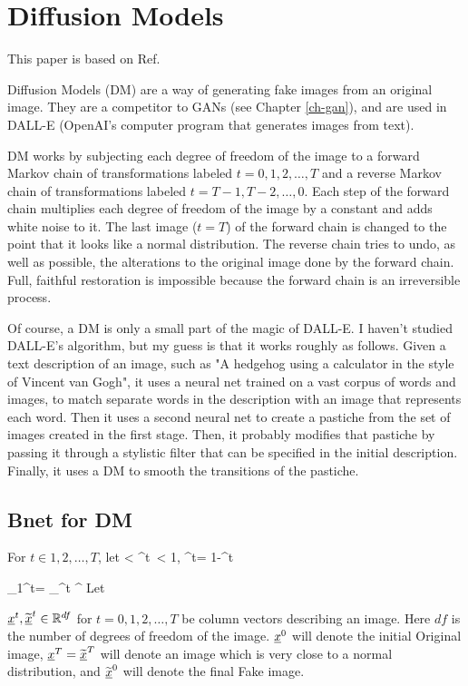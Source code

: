 \chapter{Diffusion Models}
\label{ch-diffusion}
\newcommand{\prodalp}[0]{\pi_1^t\alp}

This paper is based on
 Ref.\cite{weng-diffusion-model}

Diffusion Models (DM)
are a way of generating 
fake images from an
original image.
They are a competitor 
to GANs (see Chapter \ref{ch-gan}),
and are used in DALL-E 
(OpenAI's 
computer program
that generates images from text).


DM works by
subjecting
each degree of freedom 
of the image 
to a forward Markov
chain
of transformations
labeled $t=0, 1, 2, \ldots, T$
and a reverse Markov
chain of transformations
labeled $t=T-1, T-2, \ldots,
0$.
Each step
of the forward chain
multiplies each degree
of freedom
of the image by a constant
and adds white noise
to it.
The last  image  ($t=T$)
of the forward chain is
changed to the
point that it looks
like a normal distribution.
The reverse chain tries
to undo,
as well as possible, the alterations
to the original image
done by the forward chain.
Full, faithful restoration
is impossible
because the
forward chain
is an irreversible 
process.

Of course, a DM
is only a small part of the magic of DALL-E. I haven't
studied DALL-E's algorithm,
but my guess is that it works roughly as follows.
Given a text description
of an image, such as  
"A hedgehog using a calculator
in the style of Vincent van Gogh",
it uses a neural net
trained on a vast corpus of 
words and images, to match
separate words in the description
 with an image
 that represents each word.
Then it uses a second neural net
to create a pastiche from
the set of images created in the first
stage. Then, it 
probably modifies
that pastiche
by passing it
through a stylistic filter
that can be specified
in the initial description.
Finally, it uses a DM
to smooth the transitions of the pastiche.



\section{Bnet for DM}

For $t\in 1,2, \ldots , T$, let
< \alp^t\
< 1, \; \beta^t= 1-\alp^t
\eeq

\beq
\prodalp= \prod_{\tau=1}^t \alp^\tau
\eeq
Let 

${\underline{x}}^t, \widetilde{{\underline{x}}}^t\in { \mathbb{R}}^{df}$ for $t=0, 1, 2,
\ldots, T$ be column vectors
describing an image. Here $df$
is the number of degrees of freedom 
of the image. ${\underline{x}}^0$ 
will denote the initial Original image,
${\underline{x}}^T=\widetilde{{\underline{x}}}^T$
will denote an image which 
is very close to a 
normal distribution,
and $\widetilde{{\underline{x}}}^0$
will denote the final Fake image.

